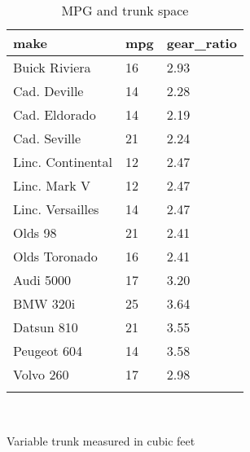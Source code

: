\documentclass{article}
\begin{document}
\begin{table}[tbp] \centering
{}

\caption{MPG and trunk space}
\begin{tabularx}{\linewidth}{@{}lCC@{}}

\toprule
{make}&{mpg}&{gear\_ratio} \tabularnewline
\midrule \addlinespace[\belowrulesep]
Buick Riviera&16&2.93 \tabularnewline
Cad. Deville&14&2.28 \tabularnewline
Cad. Eldorado&14&2.19 \tabularnewline
Cad. Seville&21&2.24 \tabularnewline
Linc. Continental&12&2.47 \tabularnewline
Linc. Mark V&12&2.47 \tabularnewline
Linc. Versailles&14&2.47 \tabularnewline
Olds 98&21&2.41 \tabularnewline
Olds Toronado&16&2.41 \tabularnewline
Audi 5000&17&3.20 \tabularnewline
BMW 320i&25&3.64 \tabularnewline
Datsun 810&21&3.55 \tabularnewline
Peugeot 604&14&3.58 \tabularnewline
Volvo 260&17&2.98 \tabularnewline
\bottomrule \addlinespace[\belowrulesep]

\end{tabularx}
\\ \parbox{\linewidth}{\footnotesize Variable trunk measured in cubic feet}
\end{table}
\end{document}
